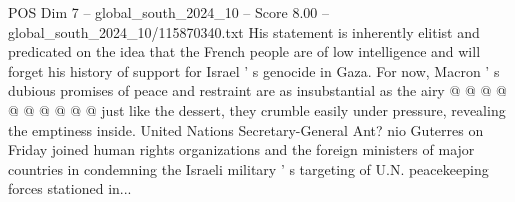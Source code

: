 \begin{textsample}{POS Dim 7 – global\_south\_2024\_10 – Score 8.00 – global\_south\_2024\_10/115870340.txt}
His statement is inherently elitist and predicated on the idea that the French people are of low intelligence and will forget his history of support for Israel ' s genocide in Gaza.
For now, Macron ' s dubious promises of peace and restraint are as insubstantial as the airy @ @ @ @ @ @ @ @ @ @ just like the dessert, they crumble easily under pressure, revealing the emptiness inside.
United Nations Secretary-General Ant? nio Guterres on Friday joined human rights organizations and the foreign ministers of major countries in condemning the Israeli military ' s targeting of U.N. peacekeeping forces stationed in...

\end{textsample}
